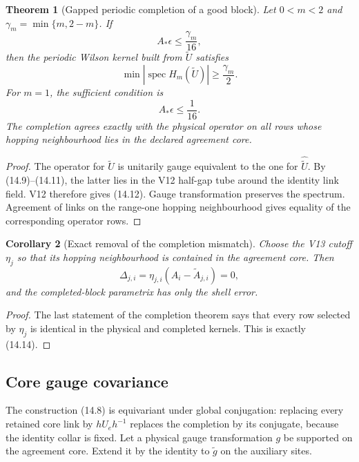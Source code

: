 \documentclass[11pt]{article}
\newtheorem{theorem}{Theorem}[section]
\newtheorem{corollary}[theorem]{Corollary}
\newcommand{\spec}{\operatorname{spec}}
\begin{document}
\begin{theorem}[Gapped periodic completion of a good block]
\label{thm:v11v14-completion}
Let \(0<m<2\) and
\(\gamma_m=\min\{m,2-m\}\).  If
\[
 A_*\epsilon\leq\frac{\gamma_m}{16},
 \tag{14.11}
\]
then the periodic Wilson kernel built from \(\widetilde U\) satisfies
\[
 \min|\spec H_m(\widetilde U)|
 \geq\frac{\gamma_m}{2}.
 \tag{14.12}
\]
For \(m=1\), the sufficient condition is
\[
 A_*\epsilon\leq\frac1{16}.
 \tag{14.13}
\]
The completion agrees exactly with the physical operator on all rows
whose hopping neighbourhood lies in the declared agreement core.
\end{theorem}

\begin{proof}
The operator for \(\widetilde U\) is unitarily gauge equivalent to the
one for \(\widehat{\widetilde U}\).  By (14.9)--(14.11), the latter lies
in the V12 half-gap tube around the identity link field.  V12 therefore
gives (14.12).  Gauge transformation preserves the spectrum.
Agreement of links on the range-one hopping neighbourhood gives equality
of the corresponding operator rows.
\end{proof}

\begin{corollary}[Exact removal of the completion mismatch]
\label{cor:v11v14-mismatch}
Choose the V13 cutoff \(\eta_j\) so that its hopping neighbourhood is
contained in the agreement core.  Then
\[
 \Delta_{j,i}=\eta_{j,i}(A_i-\widetilde A_{j,i})=0,
 \tag{14.14}
\]
and the completed-block parametrix has only the shell error.
\end{corollary}

\begin{proof}
The last statement of the completion theorem says that every row selected
by \(\eta_j\) is identical in the physical and completed kernels.
This is exactly (14.14).
\end{proof}

\subsection{Core gauge covariance}

The construction (14.8) is equivariant under global conjugation:
replacing every retained core link by
\(h\widehat U_eh^{-1}\) replaces the completion by its conjugate, because
the identity collar is fixed.  Let a physical gauge transformation \(g\)
be supported on the agreement core.  Extend it by the identity to
\(\widetilde g\) on the auxiliary sites.
\end{document}
